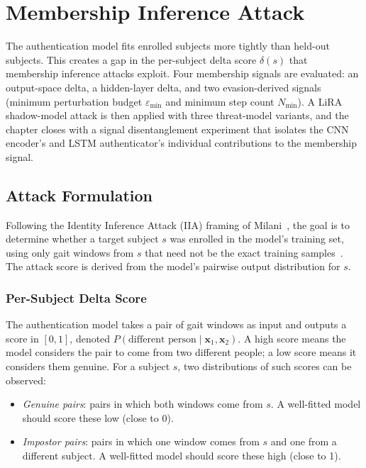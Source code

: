 \chapter{Membership Inference Attack}
\label{ch:mia}

The authentication model fits enrolled subjects more tightly than held-out subjects. This creates a gap in the per-subject delta score $\delta(s)$ that membership inference attacks exploit. Four membership signals are evaluated: an output-space delta, a hidden-layer delta, and two evasion-derived signals (minimum perturbation budget $\varepsilon_\text{min}$ and minimum step count $N_\text{min}$). A LiRA shadow-model attack is then applied with three threat-model variants, and the chapter closes with a signal disentanglement experiment that isolates the CNN encoder's and LSTM authenticator's individual contributions to the membership signal.

\section{Attack Formulation}
\label{sec:mia_formulation}

Following the Identity Inference Attack (IIA) framing of Milani~\cite{milani2024gait}, the goal is to determine whether a target subject $s$ was enrolled in the model's training set, using only gait windows from $s$ that need not be the exact training samples~\cite{li2022userlevel}. The attack score is derived from the model's pairwise output distribution for $s$.

\subsection{Per-Subject Delta Score}
\label{ssec:mia_delta}

The authentication model takes a pair of gait windows as input and outputs a score in $[0, 1]$, denoted $P(\text{different person} \mid \mathbf{x}_1, \mathbf{x}_2)$. A high score means the model considers the pair to come from two different people; a low score means it considers them genuine. For a subject $s$, two distributions of such scores can be observed:

\begin{itemize}
  \item \emph{Genuine pairs}: pairs in which both windows come from $s$.
    A well-fitted model should score these low (close to 0).
  \item \emph{Impostor pairs}: pairs in which one window comes from $s$ and
    one from a different subject.
    A well-fitted model should score these high (close to 1).
\end{itemize}

